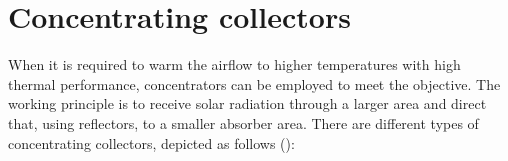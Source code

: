 
\section{Concentrating collectors}


When it is required to warm the airflow to higher temperatures with high thermal performance, concentrators can be employed to meet the objective. The working principle is to receive solar radiation through a larger area and direct that, using reflectors, to a smaller absorber area. There are different types of concentrating collectors, depicted as follows (\cite{Evangelisti2019}): %

